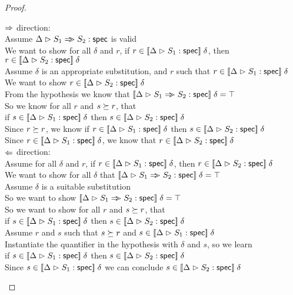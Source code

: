 \begin{proof}
  \begin{tabbedproof}
    \oo $\Rightarrow$ direction:\\
    \ooo Assume ${\Delta} \vartriangleright {S_1 \Rightarrow\!\!\!>S_2} : \mathsf{spec}$ is valid\\
    \oooo We want to show for all $\delta$ and $r$, if $r \in [\![{{\Delta} \vartriangleright {S_1} : \mathsf{spec}}]\!]\;\delta$, then 
          $r \in [\![{{\Delta} \vartriangleright {S_2} : \mathsf{spec}}]\!]\;\delta$ \\
    \oooo Assume $\delta$ is an appropriate substitution, and $r$ such that $r \in [\![{{\Delta} \vartriangleright {S_1} : \mathsf{spec}}]\!]\;\delta$ \\
    \ooooo We want to show $r \in [\![{{\Delta} \vartriangleright {S_2} : \mathsf{spec}}]\!]\;\delta$ \\
    \oooooo From the hypothesis we know that $[\![{{\Delta} \vartriangleright {S_1 \Rightarrow\!\!\!>S_2} : \mathsf{spec}}]\!]\;\delta = \top$ \\
    \oooooo So we know for all $r$ and $s \succeq r$, that \\
    \oooooox if $s \in [\![{{\Delta} \vartriangleright {S_1} : \mathsf{spec}}]\!]\;\delta$ then $s \in [\![{{\Delta} \vartriangleright {S_2} : \mathsf{spec}}]\!]\;\delta$ \\
    \oooooo Since $r \succeq r$, we know if $r \in [\![{{\Delta} \vartriangleright {S_1} : \mathsf{spec}}]\!]\;\delta$ then $s \in [\![{{\Delta} \vartriangleright {S_2} : \mathsf{spec}}]\!]\;\delta$ \\
    \oooooo Since $r \in [\![{{\Delta} \vartriangleright {S_1} : \mathsf{spec}}]\!]\;\delta$, we know that $r \in [\![{{\Delta} \vartriangleright {S_2} : \mathsf{spec}}]\!]\;\delta$ \\
    \oo $\Leftarrow$ direction:\\
    \ooo Assume for all $\delta$ and $r$, if $r \in [\![{{\Delta} \vartriangleright {S_1} : \mathsf{spec}}]\!]\;\delta$, then 
          $r \in [\![{{\Delta} \vartriangleright {S_2} : \mathsf{spec}}]\!]\;\delta$ \\
    \oooo We want to show for all $\delta$ that $[\![{{\Delta} \vartriangleright {S_1 \Rightarrow\!\!\!>S_2} : \mathsf{spec}}]\!]\;\delta = \top$ \\
    \oooo Assume $\delta$ is a suitable substitution \\
    \ooooo So we want to show $[\![{{\Delta} \vartriangleright {S_1 \Rightarrow\!\!\!>S_2} : \mathsf{spec}}]\!]\;\delta = \top$ \\
    \ooooo So we want to show for all $r$ and $s \succeq r$, that \\
    \ooooox if $s \in [\![{{\Delta} \vartriangleright {S_1} : \mathsf{spec}}]\!]\;\delta$ then $s \in [\![{{\Delta} \vartriangleright {S_2} : \mathsf{spec}}]\!]\;\delta$ \\
    \ooooo Assume $r$ and $s$ such that $s \succeq r$ and $s \in [\![{{\Delta} \vartriangleright {S_1} : \mathsf{spec}}]\!]\;\delta$ \\
    \oooooo Instantiate the quantifier in the hypothesis with $\delta$ and $s$, so we learn \\
    \oooooox if $s \in [\![{{\Delta} \vartriangleright {S_1} : \mathsf{spec}}]\!]\;\delta$ then $s \in [\![{{\Delta} \vartriangleright {S_2} : \mathsf{spec}}]\!]\;\delta$ \\
    \oooooo Since $s \in [\![{{\Delta} \vartriangleright {S_1} : \mathsf{spec}}]\!]\;\delta$ we can conclude $s \in [\![{{\Delta} \vartriangleright {S_2} : \mathsf{spec}}]\!]\;\delta$ \\
  \end{tabbedproof}
\end{proof}

